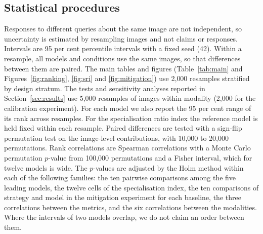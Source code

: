 \subsection{Statistical procedures}\label{sec:stats}
Responses to different queries about the same image are not independent, so uncertainty is estimated by resampling images and not claims or responses. Intervals are 95 per cent percentile intervals with a fixed seed (42). Within a resample, all models and conditions use the same images, so that differences between them are paired. The main tables and figures (Table~\ref{tab:main} and Figures~\ref{fig:ranking}, \ref{fig:sri} and \ref{fig:mitigation}) use 2{,}000 resamples stratified by design stratum. The tests and sensitivity analyses reported in Section~\ref{sec:results} use 5{,}000 resamples of images within modality (2{,}000 for the calibration experiment). For each model we also report the 95 per cent range of its rank across resamples. For the specialisation ratio index the reference model is held fixed within each resample. Paired differences are tested with a sign-flip permutation test on the image-level contributions, with 10{,}000 to 20{,}000 permutations. Rank correlations are Spearman correlations with a Monte Carlo permutation $p$-value from 100{,}000 permutations and a Fisher interval, which for twelve models is wide. The $p$-values are adjusted by the Holm method within each of the following families: the ten pairwise comparisons among the five leading models, the twelve cells of the specialisation index, the ten comparisons of strategy and model in the mitigation experiment for each baseline, the three correlations between the metrics, and the six correlations between the modalities. Where the intervals of two models overlap, we do not claim an order between them.
